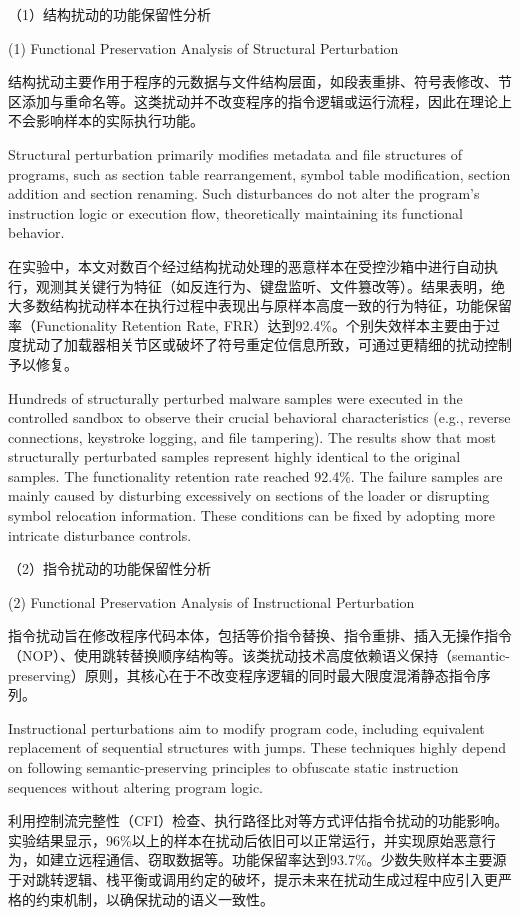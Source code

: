 （1）结构扰动的功能保留性分析

(1) Functional Preservation Analysis of Structural Perturbation

结构扰动主要作用于程序的元数据与文件结构层面，如段表重排、符号表修改、节区添加与重命名等。这类扰动并不改变程序的指令逻辑或运行流程，因此在理论上不会影响样本的实际执行功能。

Structural perturbation primarily modifies metadata and file structures of programs, such as section table rearrangement, symbol table modification, section addition and section renaming. Such disturbances do not alter the program's instruction logic or execution flow, theoretically maintaining its functional behavior.

在实验中，本文对数百个经过结构扰动处理的恶意样本在受控沙箱中进行自动执行，观测其关键行为特征（如反连行为、键盘监听、文件篡改等）。结果表明，绝大多数结构扰动样本在执行过程中表现出与原样本高度一致的行为特征，功能保留率（Functionality Retention Rate, FRR）达到92.4\%。个别失效样本主要由于过度扰动了加载器相关节区或破坏了符号重定位信息所致，可通过更精细的扰动控制予以修复。

Hundreds of structurally perturbed malware samples were executed in the controlled sandbox to observe their crucial behavioral characteristics (e.g., reverse connections, keystroke logging, and file tampering). The results show that most structurally perturbated samples represent highly identical to the original samples. The functionality retention rate reached 92.4\%. The failure samples are mainly caused by disturbing excessively on sections of the loader or disrupting symbol relocation information. These conditions can be fixed by adopting more intricate disturbance controls.

（2）指令扰动的功能保留性分析

(2) Functional Preservation Analysis of Instructional Perturbation

指令扰动旨在修改程序代码本体，包括等价指令替换、指令重排、插入无操作指令（NOP）、使用跳转替换顺序结构等。该类扰动技术高度依赖语义保持（semantic-preserving）原则，其核心在于不改变程序逻辑的同时最大限度混淆静态指令序列。

Instructional perturbations aim to modify program code, including equivalent replacement of sequential structures with jumps. These techniques highly depend on following semantic-preserving principles to obfuscate static instruction sequences without altering program logic.

利用控制流完整性（CFI）检查、执行路径比对等方式评估指令扰动的功能影响。实验结果显示，96\%以上的样本在扰动后依旧可以正常运行，并实现原始恶意行为，如建立远程通信、窃取数据等。功能保留率达到93.7\%。少数失败样本主要源于对跳转逻辑、栈平衡或调用约定的破坏，提示未来在扰动生成过程中应引入更严格的约束机制，以确保扰动的语义一致性。

